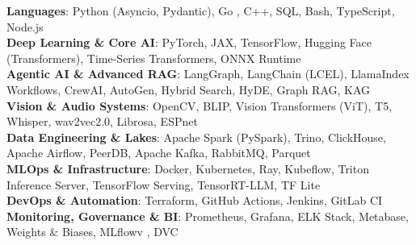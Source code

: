 \begin{itemize}[leftmargin=0.15in, label={}]
	\small{\item{
			\textbf{Languages}{: Python (Asyncio, Pydantic), Go , C++, SQL, Bash, TypeScript, Node.js} \\
			\textbf{Deep Learning \& Core AI}{: PyTorch, JAX, TensorFlow, Hugging Face (Transformers), Time-Series Transformers, ONNX Runtime} \\
			\textbf{Agentic AI \& Advanced RAG}{: LangGraph, LangChain (LCEL), LlamaIndex Workflows, CrewAI, AutoGen, Hybrid Search, HyDE, Graph RAG, KAG} \\
			\textbf{Vision \& Audio Systems}{: OpenCV, BLIP, Vision Transformers (ViT), T5, Whisper, wav2vec2.0, Librosa, ESPnet} \\
			\textbf{Data Engineering \& Lakes}{: Apache Spark (PySpark), Trino, ClickHouse, Apache Airflow, PeerDB, Apache Kafka, RabbitMQ, Parquet} \\
			\textbf{MLOps \& Infrastructure}{: Docker, Kubernetes, Ray, Kubeflow, Triton Inference Server, TensorFlow Serving, TensorRT-LLM, TF Lite} \\
			\textbf{DevOps \& Automation}{: Terraform, GitHub Actions, Jenkins, GitLab CI} \\
			\textbf{Monitoring, Governance \& BI}{: Prometheus, Grafana, ELK Stack, Metabase, Weights \& Biases, MLflowv , DVC}
	}}
\end{itemize}